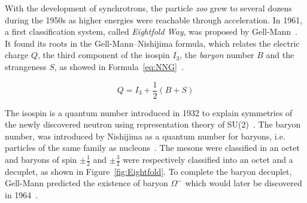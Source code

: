 	With the development of synchrotrons, the particle \textit{zoo} grew to several dozens during the 1950s as higher energies were reachable through acceleration. In 1961, a first classification system, called \textit{Eightfold Way}, was proposed by Gell-Mann~\cite{GELLMANN1962}. It found its roots in the Gell-Mann--Nishijima formula, which relates the electric charge $Q$, the third component of the isospin $I_3$, the \textit{baryon} number $B$ and the strangeness $S$, as showed in Formula~\ref{eq:NNG}~\cite{NISHIJIMA1953,NISHIJIMA1955,GELLMANN1956}.
	
	\begin{equation}
		\label{eq:NNG}
		Q = I_3 + \frac{1}{2}(B+S)
	\end{equation}
	
	The isospin is a quantum number introduced in 1932 to explain symmetries of the newly discovered neutron using representation theory of SU(2)~\cite{HEISENBERG1932}. The baryon number, was introduced by Nishijima as a quantum number for baryons, i.e. particles of the same family as nucleons~\cite{NISHIJIMA1953}. The mesons were classified in an octet and baryons of spin $\pm\frac{1}{2}$ and $\pm\frac{3}{2}$ were respectively classified into an octet and a decuplet, as shown in Figure~\ref{fig:Eightfold}. To complete the baryon decuplet, Gell-Mann predicted the existence of baryon $\Omega^-$ which would later be discovered in 1964~\cite{BARNES1964}.
	
